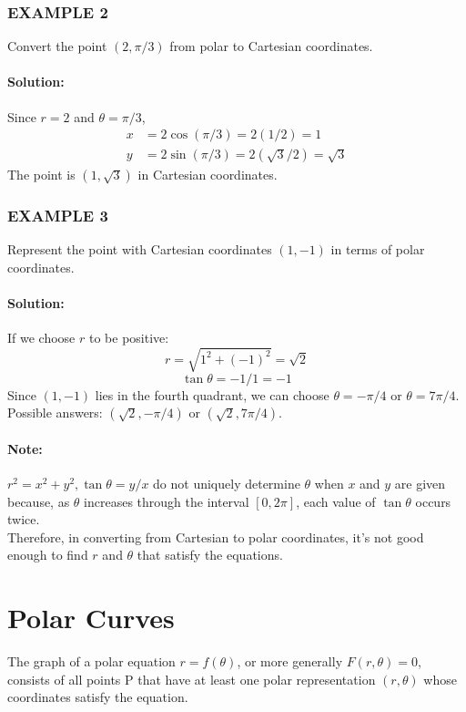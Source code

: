 \documentclass{article}
\begin{document}
\subsubsection*{EXAMPLE 2}
Convert the point $(2, \pi/3)$ from polar to Cartesian coordinates.

\paragraph{Solution:} Since $r=2$ and $\theta=\pi/3$,
\begin{align*}
    x &= 2\cos(\pi/3) = 2(1/2) = 1 \\
    y &= 2\sin(\pi/3) = 2(\sqrt{3}/2) = \sqrt{3}
\end{align*}
The point is $(1, \sqrt{3})$ in Cartesian coordinates.

\subsubsection*{EXAMPLE 3}
Represent the point with Cartesian coordinates $(1,-1)$ in terms of polar coordinates.

\paragraph{Solution:} If we choose $r$ to be positive:
\[ r = \sqrt{1^2 + (-1)^2} = \sqrt{2} \]
\[ \tan\theta = -1/1 = -1 \]
Since $(1,-1)$ lies in the fourth quadrant, we can choose $\theta = -\pi/4$ or $\theta = 7\pi/4$. Possible answers: $(\sqrt{2}, -\pi/4)$ or $(\sqrt{2}, 7\pi/4)$.

\paragraph{Note:} $r^2 = x^2 + y^2, \tan\theta = y/x$ do not uniquely determine $\theta$ when $x$ and $y$ are given because, as $\theta$ increases through the interval $[0, 2\pi]$, each value of $\tan\theta$ occurs twice. \\Therefore, in converting from Cartesian to polar coordinates, it’s not good enough to find $r$ and $\theta$ that satisfy the equations.

\section*{Polar Curves}
The graph of a polar equation $r=f(\theta)$, or more generally $F(r,\theta)=0$, consists of all points P that have at least one polar representation $(r,\theta)$ whose coordinates satisfy the equation.
\end{document}
